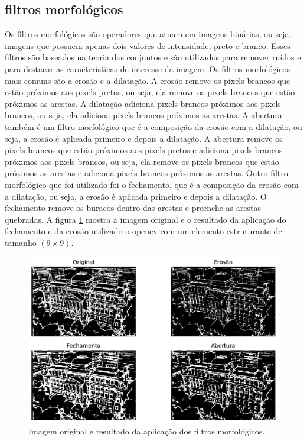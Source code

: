 \documentclass[12pt]{article}
\begin{document}
\subsection{filtros morfológicos}

Os filtros morfológicos \cite{HIPR2} são operadores que atuam em imagens binárias, ou seja, imagens que possuem apenas dois valores de intensidade, preto e branco. Esses filtros são baseados na teoria dos conjuntos e são utilizados para remover ruídos e para destacar as características de interesse da imagem. Os filtros morfológicos mais comuns são a erosão e a dilatação. A erosão remove os pixels brancos que estão próximos aos pixels pretos, ou seja, ela remove os pixels brancos que estão próximos as arestas. A dilatação adiciona pixels brancos próximos aos pixels brancos, ou seja, ela adiciona pixels brancos próximos as arestas. A abertura também é um filtro morfológico que é a composição da erosão com a dilatação, ou seja, a erosão é aplicada primeiro e depois a dilatação. A abertura remove os pixels brancos que estão próximos aos pixels pretos e adiciona pixels brancos próximos aos pixels brancos, ou seja, ela remove os pixels brancos que estão próximos as arestas e adiciona pixels brancos próximos as arestas. Outro filtro morfológico que foi utilizado foi o fechamento, que é a composição da erosão com a dilatação, ou seja, a erosão é aplicada primeiro e depois a dilatação. O fechamento remove os buracos dentro das arestas e preenche as arestas quebradas. A figura \ref{fig:morf} mostra a imagem original e o resultado da aplicação do fechamento e da erosão utilizado o opencv \cite{opencv_morphology} com um elemento estruturante de tamanho $(9\times9)$.

\begin{figure}
\centering
\includegraphics[scale=0.60]{morf.pdf}
\caption{Imagem original e resultado da aplicação dos filtros morfológicos.}
\label{fig:morf}
\end{figure}
\end{document}
